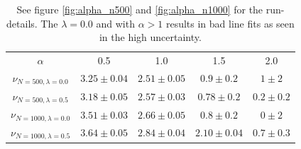 \documentclass[a4paper,11pt]{article}
\begin{document}
{\begin{table}[h]
\caption{See figure \ref{fig:alpha_n500} and \ref{fig:alpha_n1000} for the run-details. The $\lambda=0.0$ and with $\alpha>1$ results in bad line fits as seen in the high uncertainty. }
\begin{center}
\begin{tabular}{c|c|c|c|c}
$\alpha$ & 0.5 & 1.0 & 1.5 & 2.0 \\
$\nu_{N=500, \lambda=0.0}$ & $3.25\pm0.04$ & $2.51 \pm 0.05$ & $0.9 \pm 0.2$ & $1 \pm 2$ \\
$\nu_{N=500, \lambda=0.5}$ & $3.18\pm 0.05$ & $2.57\pm0.03$ & $0.78\pm 0.2$ & $0.2\pm 0.2$  \\
$\nu_{N=1000, \lambda=0.0}$ & $3.51\pm 0.03$ & $2.66\pm 0.05$ & $0.8\pm0.2$  & $0\pm 2$ \\
$\nu_{N=1000, \lambda=0.5}$ & $3.64\pm0.05$ & $2.84\pm 0.04$ & $2.10\pm 0.04$ & $0.7\pm 0.3$ 
\end{tabular}
\end{center}
\label{tab:closepartner}
\end{table}%







}
\end{document}

